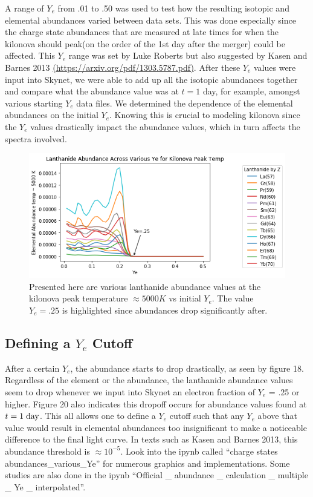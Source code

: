 \documentclass[11pt,a4paper]{article}
\begin{document}
A range of $Y_e$ from .01 to .50 was used to test how the resulting isotopic and elemental abundances varied between data sets. This was done especially since the charge state abundances that are measured at late times for when the kilonova should peak(on the order of the 1st day after the merger) could be affected. This $Y_e$ range was set by Luke Roberts but also suggested by Kasen and Barnes 2013 \url{(https://arxiv.org/pdf/1303.5787.pdf)}.
After these $Y_e$ values were input into Skynet, we were able to add up all the isotopic abundances together and compare what the abundance value was at $t = 1$ day, for example, amongst various starting $Y_e$ data files. We determined the dependence of the elemental abundances on the initial $Y_e$. Knowing this is crucial to modeling kilonova since the $Y_e$ values drastically impact the abundance values, which in turn affects the spectra involved.


\begin{figure}[h!]
  \includegraphics[scale = .6]{abun_vs_ye_temp.png}
  \centering
  \caption{Presented here are various lanthanide abundance values at the kilonova peak temperature  $\approx 5000K$ vs initial $Y_e$. The value $Y_e = .25$ is highlighted since abundances drop significantly after.}
\end{figure} 

\pagebreak 

\subsection{Defining a $Y_e$ Cutoff}

After a certain $Y_e$, the abundance starts to drop drastically, as seen by figure 18. Regardless of the element or the abundance, the lanthanide abundance values seem to drop whenever we input into Skynet an electron fraction of $Y_e$ = .25 or higher. Figure 20 also indicates this dropoff occurs for abundance values found at $t = \mathrm{1 \hspace{1 mm} day}$. This all allows one to define a $Y_e$ cutoff such that any $Y_e$ above that value would result in elemental abundances too insignificant to make a noticeable difference to the final light curve. In texts such as Kasen and Barnes 2013, this abundance threshold is $\approx 10^{-5}$.  
Look into the ipynb called “charge states abundances\_various\_Ye” for numerous graphics and implementations. Some studies are also done in the ipynb “Official \_ abundance \_ calculation \_ multiple \_ Ye \_ interpolated”. 
\end{document}
